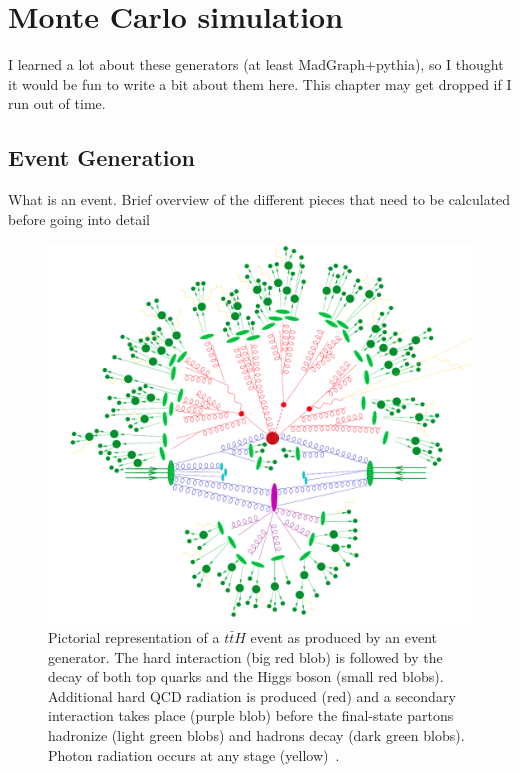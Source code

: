 \chapter[Monte Carlo simulation][Monte Carlo simulation]{Monte Carlo simulation}
\label{ch:mc}

{\color{red}
  I learned a lot about these generators (at least MadGraph+pythia),
  so I thought it would be fun to write a bit about them here.
  This chapter may get dropped if I run out of time.
}

\section{Event Generation}

{\color{red} What is an event. Brief overview of the different pieces that need
  to be calculated before going into detail}

  \begin{figure}[p]
    \centering
    \includegraphics[width=\textwidth, clip=true, trim=0 0 0 0]
    {figs/mc_gen/full_mc_event.png}
    \caption[
      Pictorial representation of a $t\bar{t}H$ event as produced by an event
      generator~\cite{Gleisberg:2008ta}.
    ]{
      Pictorial representation of a $t\bar{t}H$ event as produced by an event
      generator.
      The hard interaction (big red blob) is followed by the decay of both top
      quarks and the Higgs boson (small red blobs).
      Additional hard QCD radiation is produced (red) and a secondary
      interaction takes place (purple blob) before the final-state partons
      hadronize (light green blobs) and hadrons decay (dark green blobs).
      Photon radiation occurs at any stage (yellow)~\cite{Gleisberg:2008ta}.
    }
    \label{fig:mc_event}
\end{figure}


